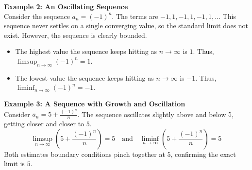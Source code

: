 \textbf{Example 2: An Oscillating Sequence}\\
Consider the sequence $a_n = (-1)^n$.
The terms are $-1, 1, -1, 1, -1, 1, \ldots$
This sequence never settles on a single converging value, so the standard limit does not exist. However, the sequence is clearly bounded.
\begin{itemize}
    \item The highest value the sequence keeps hitting as $n \to \infty$ is $1$. Thus, $\limsup_{n \to \infty} (-1)^n = 1$.
    \item The lowest value the sequence keeps hitting as $n \to \infty$ is $-1$. Thus, $\liminf_{n \to \infty} (-1)^n = -1$.
\end{itemize}

\textbf{Example 3: A Sequence with Growth and Oscillation}\\
Consider $a_n = 5 + \frac{(-1)^n}{n}$.
The sequence oscillates slightly above and below $5$, getting closer and closer to $5$.
\[ \limsup_{n \to \infty} \left(5 + \frac{(-1)^n}{n}\right) = 5 \quad \text{and} \quad \liminf_{n \to \infty} \left(5 + \frac{(-1)^n}{n}\right) = 5 \]
Both estimates boundary conditions pinch together at $5$, confirming the exact limit is $5$.

